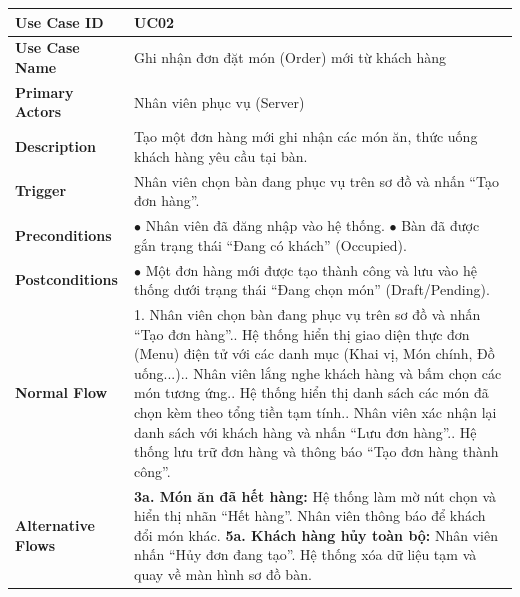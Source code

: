 \begin{longtable}{|p{3.5cm}|p{12.5cm}|}
\hline
\textbf{Use Case ID} & UC02 \\ \hline
\textbf{Use Case Name} & Ghi nhận đơn đặt món (Order) mới từ khách hàng \\ \hline
\textbf{Primary Actors} & Nhân viên phục vụ (Server) \\ \hline
\textbf{Description} & Tạo một đơn hàng mới ghi nhận các món ăn, thức uống khách hàng yêu cầu tại bàn. \\ \hline
\textbf{Trigger} & Nhân viên chọn bàn đang phục vụ trên sơ đồ và nhấn ``Tạo đơn hàng''. \\ \hline
\textbf{Preconditions} &
$\bullet$ Nhân viên đã đăng nhập vào hệ thống.\newline
$\bullet$ Bàn đã được gắn trạng thái ``Đang có khách'' (Occupied). \\ \hline
\textbf{Postconditions} & $\bullet$ Một đơn hàng mới được tạo thành công và lưu vào hệ thống dưới trạng thái ``Đang chọn món'' (Draft/Pending). \\ \hline
\textbf{Normal Flow} &
1. Nhân viên chọn bàn đang phục vụ trên sơ đồ và nhấn ``Tạo đơn hàng''.\newline
2. Hệ thống hiển thị giao diện thực đơn (Menu) điện tử với các danh mục (Khai vị, Món chính, Đồ uống...).\newline
3. Nhân viên lắng nghe khách hàng và bấm chọn các món tương ứng.\newline
4. Hệ thống hiển thị danh sách các món đã chọn kèm theo tổng tiền tạm tính.\newline
5. Nhân viên xác nhận lại danh sách với khách hàng và nhấn ``Lưu đơn hàng''.\newline
6. Hệ thống lưu trữ đơn hàng và thông báo ``Tạo đơn hàng thành công''. \\ \hline
\textbf{Alternative Flows} &
\textbf{3a. Món ăn đã hết hàng:} Hệ thống làm mờ nút chọn và hiển thị nhãn ``Hết hàng''. Nhân viên thông báo để khách đổi món khác.\newline
\textbf{5a. Khách hàng hủy toàn bộ:} Nhân viên nhấn ``Hủy đơn đang tạo''. Hệ thống xóa dữ liệu tạm và quay về màn hình sơ đồ bàn. \\ \hline
\end{longtable}

